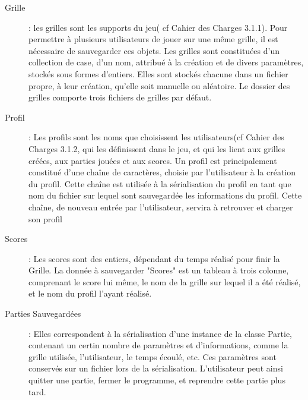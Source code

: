 \documentclass[11pt]{article}
\begin{document}
\begin{description}
    \item [Grille] : les grilles sont les supports du jeu( cf Cahier des Charges 3.1.1). Pour permettre à plusieurs utilisateurs de jouer sur une même grille, il est nécessaire de sauvegarder ces objets. Les grilles sont constituées d'un collection de case, d'un nom, attribué à la création et de divers paramètres, stockés sous formes d'entiers. Elles sont stockés chacune dans un fichier propre, à leur création, qu'elle soit manuelle ou aléatoire. Le dossier des grilles comporte trois fichiers de grilles par défaut.
    \item [Profil] : Les profils sont les noms que choisissent les utilisateurs(cf Cahier des Charges 3.1.2, qui les définissent dans le jeu, et qui les lient aux grilles créées, aux parties jouées et aux scores. Un profil est principalement constitué d'une chaîne de caractères, choisie par l'utilisateur à la création du profil. Cette chaîne est utilisée à la sérialisation du profil en tant que nom du fichier sur lequel sont sauvegardée les informations du profil. Cette chaîne, de nouveau entrée par l'utilisateur, servira à retrouver et charger son profil
    \item [Scores] : Les scores sont des entiers, dépendant du temps réalisé pour finir la Grille. La donnée à sauvegarder "Scores" est un tableau à trois colonne, comprenant le score lui même, le nom de la grille sur lequel il a été réalisé, et le nom du profil l'ayant réalisé.
    \item [Parties Sauvegardées] : Elles correspondent à la sérialisation d'une instance de la classe Partie, contenant un certin nombre de paramètres et d'informations, comme la grille utilisée, l'utilisateur, le temps écoulé, etc. Ces paramètres sont conservés sur un fichier lors de la sérialisation. L'utilisateur peut ainsi quitter une partie, fermer le programme, et reprendre cette partie plus tard.
\end{description}
\end{document}
